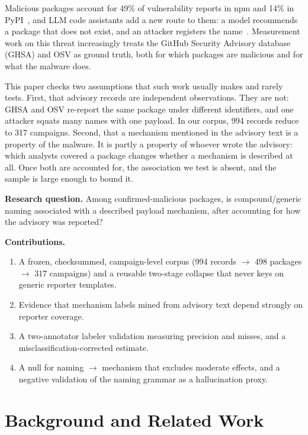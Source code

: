 \documentclass[10pt,conference]{IEEEtran}
\begin{document}
Malicious packages account for 49\% of vulnerability reports in npm and
14\% in PyPI~\cite{akhavani2025}, and LLM code assistants add a
new route to them: a model recommends a package that does not exist, and an
attacker registers the name~\cite{spracklen2024,huang2026}. Measurement work
on this threat increasingly treats the GitHub Security Advisory database
(GHSA) and OSV as ground truth, both for which packages are malicious and
for what the malware does.

This paper checks two assumptions that such work usually makes and rarely
tests. First, that advisory records are independent observations. They are
not: GHSA and OSV re-report the same package under different identifiers,
and one attacker squats many names with one payload. In our corpus, 994
records reduce to 317 campaigns. Second, that a mechanism mentioned in the
advisory text is a property of the malware. It is partly a property of
whoever wrote the advisory: which analysts covered a package changes
whether a mechanism is described at all. Once both are accounted for, the
association we test is absent, and the sample is large enough to bound it.

\textbf{Research question.} Among confirmed-malicious packages, is
compound/generic naming associated with a described payload mechanism,
after accounting for how the advisory was reported?

\textbf{Contributions.}
\begin{enumerate}
\item A frozen, checksummed, campaign-level corpus (994 records
$\rightarrow$ 498 packages $\rightarrow$ 317 campaigns) and a reusable
two-stage collapse that never keys on generic reporter templates.
\item Evidence that mechanism labels mined from advisory text depend
strongly on reporter coverage.
\item A two-annotator labeler validation measuring precision and misses,
and a misclassification-corrected estimate.
\item A null for naming $\rightarrow$ mechanism that excludes moderate
effects, and a negative validation of the naming grammar as a
hallucination proxy.
\end{enumerate}

\section{Background and Related Work}
\label{sec:related}
\end{document}
